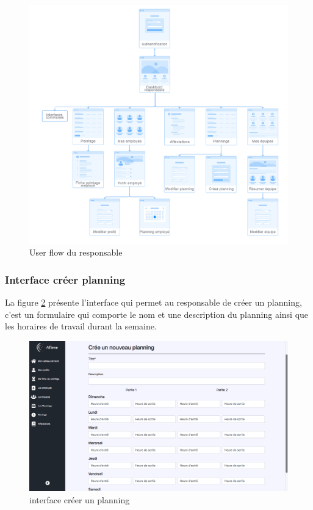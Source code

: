         \clearpage
            \begin{figure}[h!]
                \centering
                \includegraphics[scale=0.3]{images/interface/Espace responsable.png}
                \caption{User flow du responsable}
                \label{fig98}
            \end{figure}
        
            \subsubsection*{Interface créer planning}
                La figure \ref{fig99} présente l'interface qui permet au responsable de créer un planning, c'est un formulaire qui comporte le nom et une description du planning ainsi que les horaires de travail durant la semaine.
            
        \clearpage
            
                \begin{figure}[h!]
                    \vspace{-10pt}
                             \centering
                                \includegraphics[scale=0.305 ]{images/interface/add_planning.png}
                             \caption{interface créer un planning}
                             \label{fig99}
                \end{figure}
            \vspace{-20pt}
